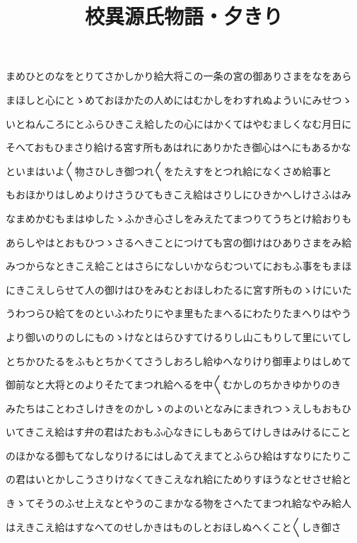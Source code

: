 \documentclass[a4paper,11pt,landscape]{ltjtarticle}
\title{校異源氏物語・夕きり}
\date{}
\begin{document}
\maketitle

まめひとのなをとりてさかしかり給大将この一条の宮の御ありさまをなをあら
\par\medskip
まほしと心にとゝめておほかたの人めにはむかしをわすれぬよういにみせつゝ
\par\medskip
いとねんころにとふらひきこえ給したの心にはかくてはやむましくなむ月日に
\par\medskip
そへておもひまさり給ける宮す所もあはれにありかたき御心はへにもあるかな
\par\medskip
といまはいよ〱物さひしき御つれ〱をたえすをとつれ給になくさめ給事と
\par\medskip
もおほかりはしめよりけさうひてもきこえ給はさりしにひきかへしけさふはみ
\par\medskip
なまめかむもまはゆしたゝふかき心さしをみえたてまつりてうちとけ給おりも
\par\medskip
あらしやはとおもひつゝさるへきことにつけても宮の御けはひありさまをみ給
\par\medskip
みつからなときこえ給ことはさらになしいかならむついてにおもふ事をもまほ
\par\medskip
にきこえしらせて人の御けはひをみむとおほしわたるに宮す所ものゝけにいた
\par\medskip
うわつらひ給てをのといふわたりにやま里もたまへるにわたりたまへりはやう
\par\medskip
より御いのりのしにものゝけなとはらひすてけるりし山こもりして里にいてし
\par\medskip
とちかひたるをふもとちかくてさうしおろし給ゆへなりけり御車よりはしめて
\par\medskip
御前なと大将とのよりそたてまつれ給へるを中〱むかしのちかきゆかりのき
\par\medskip
みたちはことわさしけきをのかしゝのよのいとなみにまきれつゝえしもおもひ
\par\medskip
いてきこえ給はす弁の君はたおもふ心なきにしもあらてけしきはみけるにこと
\par\medskip
のほかなる御もてなしなりけるにはしゐてえまてとふらひ給はすなりにたりこ
\par\medskip
の君はいとかしこうさりけなくてきこえなれ給にためりすほうなとせさせ給と
\par\medskip
きゝてそうのふせ上えなとやうのこまかなる物をさへたてまつれ給なやみ給人
\par\medskip
はえきこえ給はすなへてのせしかきはものしとおほしぬへくこと〱しき御さ
\end{document}
